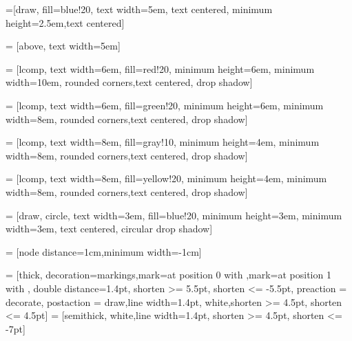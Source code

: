 \documentclass{article}
\begin{document}

=[draw, fill=blue!20, text width=5em, 
    text centered, minimum height=2.5em,text centered]

 = [above, text width=5em]

 = [lcomp, text width=6em, fill=red!20, 
    minimum height=6em, minimum width=10em, rounded corners,text centered, drop shadow]

 = [lcomp, text width=6em,
    fill=green!20, minimum height=6em, minimum width=8em, rounded corners,text centered, drop shadow]

 = [lcomp, text width=8em, fill=gray!10, 
    minimum height=4em, minimum width=8em, rounded corners,text centered, drop shadow]

 = [lcomp, text width=8em, fill=yellow!20, 
    minimum height=4em, minimum width=8em, rounded corners,text centered, drop shadow]

 = [draw, circle, text width=3em, fill=blue!20,
	minimum height=3em, minimum width=3em, text centered, circular drop shadow]

 = [node distance=1cm,minimum width=-1cm]

 = [thick, decoration={markings,mark=at position 0 with {},mark=at position
   1 with {}},
   double distance=1.4pt, shorten >= 5.5pt, shorten <= -5.5pt,
   preaction = {decorate},
   postaction = {draw,line width=1.4pt, white,shorten >= 4.5pt, shorten <= 4.5pt}]
 = [semithick, white,line width=1.4pt, shorten >= 4.5pt, shorten <= -7pt]
\end{document}

